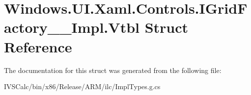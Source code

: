 \hypertarget{struct_windows_1_1_u_i_1_1_xaml_1_1_controls_1_1_i_grid_factory_____impl_1_1_vtbl}{}\section{Windows.\+U\+I.\+Xaml.\+Controls.\+I\+Grid\+Factory\+\_\+\+\_\+\+Impl.\+Vtbl Struct Reference}
\label{struct_windows_1_1_u_i_1_1_xaml_1_1_controls_1_1_i_grid_factory_____impl_1_1_vtbl}


The documentation for this struct was generated from the following file\+:\begin{DoxyCompactItemize}
\item 
I\+V\+S\+Calc/bin/x86/\+Release/\+A\+R\+M/ilc/Impl\+Types.\+g.\+cs\end{DoxyCompactItemize}

